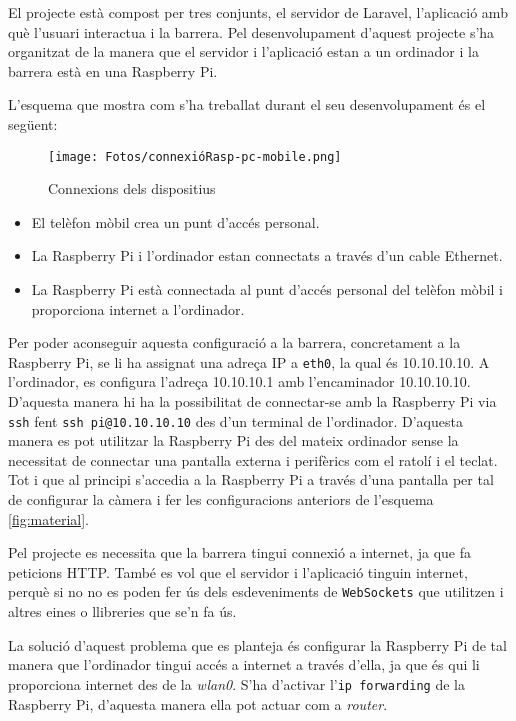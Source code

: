 El projecte està compost per tres conjunts, el servidor de Laravel,
l'aplicació amb què l'usuari interactua i la barrera.
Pel desenvolupament d'aquest projecte s'ha organitzat de la manera que
el servidor i l'aplicació estan a un ordinador i la barrera està en una Raspberry Pi.

L'esquema que mostra com s'ha treballat durant el seu desenvolupament
és el següent:

\begin{figure}[H]
    \begin{center}
        \texttt{[image: Fotos/connexióRasp-pc-mobile.png]}
    \end{center}
    \caption{Connexions dels dispositius}
    \label{fig:material}
\end{figure}

\begin{itemize}
    \item El telèfon mòbil crea un punt d'accés personal.
    \item La Raspberry Pi i l'ordinador estan connectats a través d'un cable
    Ethernet.
    \item La Raspberry Pi està connectada al punt d'accés personal del telèfon mòbil
    i proporciona internet a l'ordinador.
\end{itemize}

Per poder aconseguir aquesta configuració a la barrera, concretament a la Raspberry Pi, se li ha assignat una
adreça IP a \texttt{eth0}, la qual és 10.10.10.10.
A l'ordinador, es configura l'adreça 10.10.10.1 amb l'encaminador 10.10.10.10.
D'aquesta manera hi ha la possibilitat de connectar-se amb la Raspberry Pi
via \texttt{ssh} fent \texttt{ssh pi@10.10.10.10} des d'un terminal de l'ordinador.
D'aquesta manera es pot utilitzar la Raspberry Pi des del mateix ordinador
sense la necessitat de connectar una pantalla externa i perifèrics com el ratolí
i el teclat. Tot i que al principi s'accedia a la Raspberry Pi a través d'una pantalla
per tal de configurar la càmera i fer les configuracions anteriors de l'esquema \autoref{fig:material}.

Pel projecte es necessita que la barrera tingui connexió a internet, ja que
fa peticions HTTP. També es vol que el servidor i l'aplicació tinguin internet,
perquè si no no es poden fer ús dels esdeveniments de \texttt{WebSockets} que utilitzen
i altres eines o llibreries que se'n fa ús.

La solució d'aquest problema que es planteja és
configurar la Raspberry Pi de tal manera que l'ordinador tingui accés a internet a través d'ella,
ja que és qui li proporciona internet des de la \emph{wlan0}.
S'ha d'activar l'\texttt{ip forwarding} de la Raspberry Pi, d'aquesta manera ella pot actuar
com a \textsl{router}.

